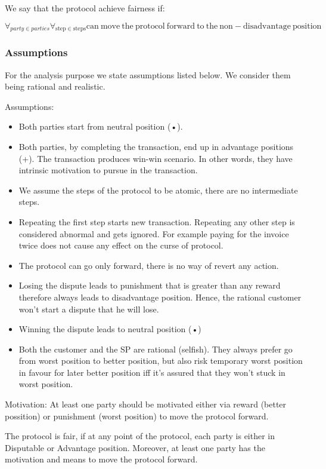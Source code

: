 \documentclass{article}
\begin{document}
We say that the protocol achieve fairness if:

$$\forall_{party \in parties}\forall_{\mathrm{step} \in \mathrm{steps}} \mathrm{can\ move\ the\ protocol\ forward\ to\ the\ non-disadvantage\ position}$$


\subsubsection{Assumptions}
For the analysis purpose we state assumptions listed below. We consider them being rational and realistic.

Assumptions:
\begin{itemize}
    
\item Both parties start from neutral position (•).
\item Both parties, by completing the transaction, end up in advantage positions (+). The transaction produces win-win scenario. In other words, they have intrinsic motivation to pursue in the transaction.
\item We assume the steps of the protocol to be atomic, there are no intermediate steps.
\item Repeating the first step starts new transaction. Repeating any other step is considered abnormal and gets ignored. For example paying for the invoice twice does not cause any effect on the curse of protocol.
\item The protocol can go only forward, there is no way of revert any action.
\item Losing the dispute leads to punishment that is greater than any reward therefore always leads to disadvantage position. Hence, the rational customer won't start a dispute that he will lose.
\item Winning the dispute leads to neutral position (•)
\item Both the customer and the SP are rational (selfish). They always prefer go from worst position to better position, but also risk temporary worst position in favour for later better position iff it's assured that they won't stuck in worst position. 
\end{itemize}

Motivation:
At least one party should be motivated either via reward (better possition) or punishment (worst position) to move the protocol forward.

The protocol is fair, if at any point of the protocol, each party is either in Disputable or Advantage position. Moreover, at least one party has the motivation and means to move the protocol forward. 
\end{document}
